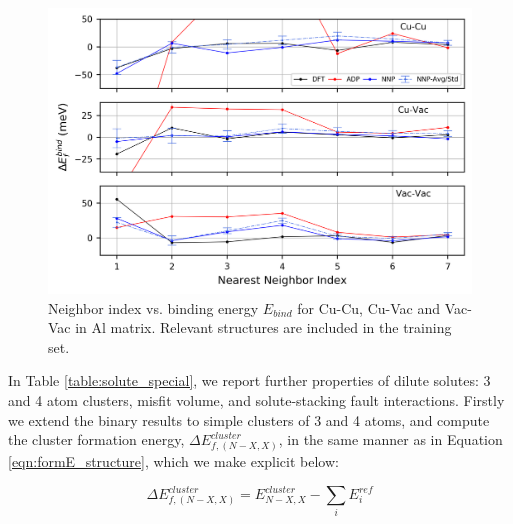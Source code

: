 \documentclass{article}
\begin{document}
\begin{figure}[H]%
\centering%
\includegraphics[width=1\textwidth,center]{./figures/solsol_in_al.png}%
\caption{Neighbor index vs. binding energy $E_{bind}$ for Cu-Cu, Cu-Vac and Vac-Vac in Al matrix. 
Relevant structures are included in the training set.}%
\label{fig:solsol_in_al}
\end{figure}


In Table \ref{table:solute_special}, we report further properties of dilute solutes: 3 and 4 atom clusters, misfit volume, and solute-stacking fault interactions.
Firstly we extend the binary results to simple clusters of 3 and 4 atoms, and compute the cluster formation energy, $\Delta E^{cluster}_{f,(N-X,X)}$,
in the same manner as in Equation \ref{eqn:formE_structure}, which we make explicit below:

\begin{equation}
\Delta E^{cluster}_{f,(N-X,X)} = E^{cluster}_{N-X,X} - \sum_i E^{ref}_i
\end{equation}
\end{document}
